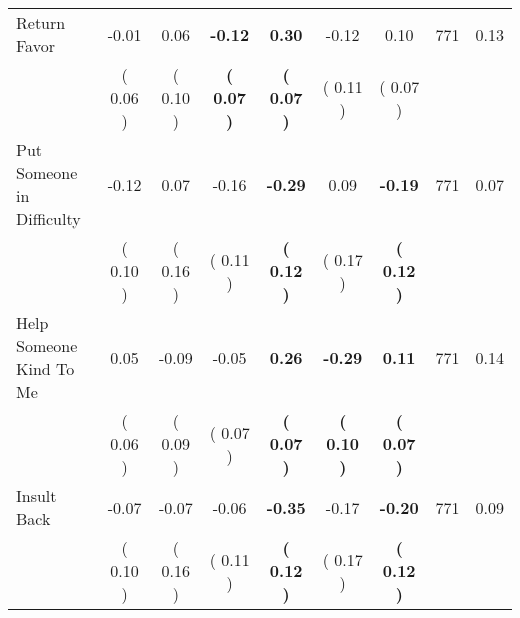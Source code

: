 \begin{tabular}{lcccccccc}
Return Favor &     -0.01 &      0.06 & \textbf{    -0.12} & \textbf{     0.30} &     -0.12 &      0.10 & 771 &       0.13 \\ 
 & (     0.06 ) & (     0.10 ) & \textbf{(     0.07 )} & \textbf{(     0.07 )} & (     0.11 ) & (     0.07 ) & \\
Put Someone in Difficulty &     -0.12 &      0.07 &     -0.16 & \textbf{    -0.29} &      0.09 & \textbf{    -0.19} & 771 &       0.07 \\ 
 & (     0.10 ) & (     0.16 ) & (     0.11 ) & \textbf{(     0.12 )} & (     0.17 ) & \textbf{(     0.12 )} & \\
Help Someone Kind To Me &      0.05 &     -0.09 &     -0.05 & \textbf{     0.26} & \textbf{    -0.29} & \textbf{     0.11} & 771 &       0.14 \\ 
 & (     0.06 ) & (     0.09 ) & (     0.07 ) & \textbf{(     0.07 )} & \textbf{(     0.10 )} & \textbf{(     0.07 )} & \\
Insult Back &     -0.07 &     -0.07 &     -0.06 & \textbf{    -0.35} &     -0.17 & \textbf{    -0.20} & 771 &       0.09 \\ 
 & (     0.10 ) & (     0.16 ) & (     0.11 ) & \textbf{(     0.12 )} & (     0.17 ) & \textbf{(     0.12 )} & \\
\bottomrule
\end{tabular}
